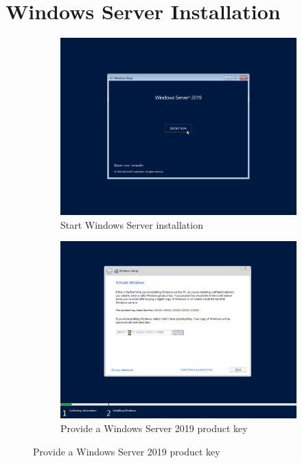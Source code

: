 \section{Windows Server Installation}
\begin{figure}[!htb]
	\begin{subfigure}{0.5\textwidth}
		\captionsetup{width=0.8\linewidth}
		\includegraphics[width=0.9\linewidth]{img/Methodologie/Migration4.png}
		\centering
		\caption{Start Windows Server installation}
	\end{subfigure}
	\begin{subfigure}{0.5\textwidth}
		\captionsetup{width=0.8\linewidth}
		\includegraphics[width=0.9\linewidth]{img/Methodologie/Migration5.png} 
		\centering
		\caption{Provide a Windows Server 2019 product key}
	\end{subfigure}
\end{figure}
